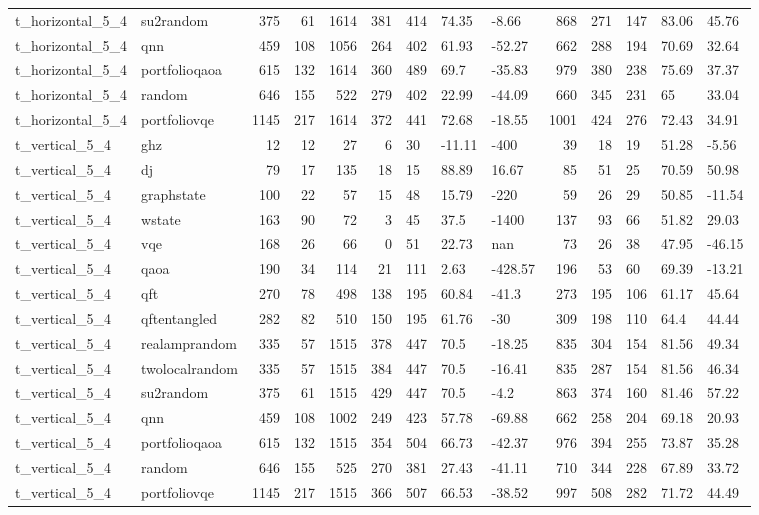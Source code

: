 \begin{longtable}{llrrrrlllrrlll}
t\_horizontal\_5\_4 & su2random & 375 & 61 & 1614 & 381 & 414 & 74.35 & -8.66 & 868 & 271 & 147 & 83.06 & 45.76 \\
t\_horizontal\_5\_4 & qnn & 459 & 108 & 1056 & 264 & 402 & 61.93 & -52.27 & 662 & 288 & 194 & 70.69 & 32.64 \\
t\_horizontal\_5\_4 & portfolioqaoa & 615 & 132 & 1614 & 360 & 489 & 69.7 & -35.83 & 979 & 380 & 238 & 75.69 & 37.37 \\
t\_horizontal\_5\_4 & random & 646 & 155 & 522 & 279 & 402 & 22.99 & -44.09 & 660 & 345 & 231 & 65 & 33.04 \\
t\_horizontal\_5\_4 & portfoliovqe & 1145 & 217 & 1614 & 372 & 441 & 72.68 & -18.55 & 1001 & 424 & 276 & 72.43 & 34.91 \\
t\_vertical\_5\_4 & ghz & 12 & 12 & 27 & 6 & 30 & -11.11 & -400 & 39 & 18 & 19 & 51.28 & -5.56 \\
t\_vertical\_5\_4 & dj & 79 & 17 & 135 & 18 & 15 & 88.89 & 16.67 & 85 & 51 & 25 & 70.59 & 50.98 \\
t\_vertical\_5\_4 & graphstate & 100 & 22 & 57 & 15 & 48 & 15.79 & -220 & 59 & 26 & 29 & 50.85 & -11.54 \\
t\_vertical\_5\_4 & wstate & 163 & 90 & 72 & 3 & 45 & 37.5 & -1400 & 137 & 93 & 66 & 51.82 & 29.03 \\
t\_vertical\_5\_4 & vqe & 168 & 26 & 66 & 0 & 51 & 22.73 & nan & 73 & 26 & 38 & 47.95 & -46.15 \\
t\_vertical\_5\_4 & qaoa & 190 & 34 & 114 & 21 & 111 & 2.63 & -428.57 & 196 & 53 & 60 & 69.39 & -13.21 \\
t\_vertical\_5\_4 & qft & 270 & 78 & 498 & 138 & 195 & 60.84 & -41.3 & 273 & 195 & 106 & 61.17 & 45.64 \\
t\_vertical\_5\_4 & qftentangled & 282 & 82 & 510 & 150 & 195 & 61.76 & -30 & 309 & 198 & 110 & 64.4 & 44.44 \\
t\_vertical\_5\_4 & realamprandom & 335 & 57 & 1515 & 378 & 447 & 70.5 & -18.25 & 835 & 304 & 154 & 81.56 & 49.34 \\
t\_vertical\_5\_4 & twolocalrandom & 335 & 57 & 1515 & 384 & 447 & 70.5 & -16.41 & 835 & 287 & 154 & 81.56 & 46.34 \\
t\_vertical\_5\_4 & su2random & 375 & 61 & 1515 & 429 & 447 & 70.5 & -4.2 & 863 & 374 & 160 & 81.46 & 57.22 \\
t\_vertical\_5\_4 & qnn & 459 & 108 & 1002 & 249 & 423 & 57.78 & -69.88 & 662 & 258 & 204 & 69.18 & 20.93 \\
t\_vertical\_5\_4 & portfolioqaoa & 615 & 132 & 1515 & 354 & 504 & 66.73 & -42.37 & 976 & 394 & 255 & 73.87 & 35.28 \\
t\_vertical\_5\_4 & random & 646 & 155 & 525 & 270 & 381 & 27.43 & -41.11 & 710 & 344 & 228 & 67.89 & 33.72 \\
t\_vertical\_5\_4 & portfoliovqe & 1145 & 217 & 1515 & 366 & 507 & 66.53 & -38.52 & 997 & 508 & 282 & 71.72 & 44.49 \\
\end{longtable}
